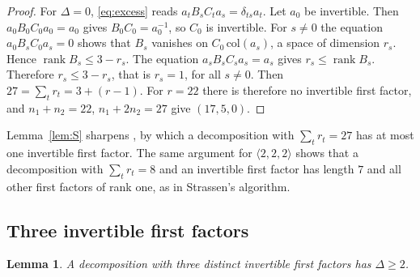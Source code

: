 \documentclass[11pt]{amsart}
\newtheorem{lemma}[theorem]{Lemma}
\theoremstyle{definition}
\theoremstyle{remark}
\numberwithin{equation}{section}
\newcommand{\rk}{\operatorname{rank}}
\begin{document}
\begin{proof}
For $\Delta=0$, \eqref{eq:excess} reads $a_tB_sC_ta_s=\delta_{ts}a_t$. Let $a_0$ be invertible. Then $a_0B_0C_0a_0=a_0$ gives $B_0C_0=a_0^{-1}$, so $C_0$ is invertible. For $s\ne 0$ the equation $a_0B_sC_0a_s=0$ shows that $B_s$ vanishes on $C_0\,\mathrm{col}(a_s)$, a space of dimension $r_s$. Hence $\rk B_s\le 3-r_s$. The equation $a_sB_sC_sa_s=a_s$ gives $r_s\le\rk B_s$. Therefore $r_s\le 3-r_s$, that is $r_s=1$, for all $s\ne 0$. Then $27=\sum_tr_t=3+(r-1)$. For $r=22$ there is therefore no invertible first factor, and $n_1+n_2=22$, $n_1+2n_2=27$ give $(17,5,0)$.
\end{proof}

Lemma~\ref{lem:S} sharpens \cite[Proposition~5.3 and Corollary~6.1]{Yan26}, by which a decomposition with $\sum_tr_t=27$ has at most one invertible first factor. The same argument for $\langle 2,2,2\rangle$ shows that a decomposition with $\sum_t r_t=8$ and an invertible first factor has length $7$ and all other first factors of rank one, as in Strassen's algorithm.

\subsection{Three invertible first factors}

\begin{lemma}\label{lem:S3}
A decomposition with three distinct invertible first factors has $\Delta\ge 2$.
\end{lemma}
\end{document}
